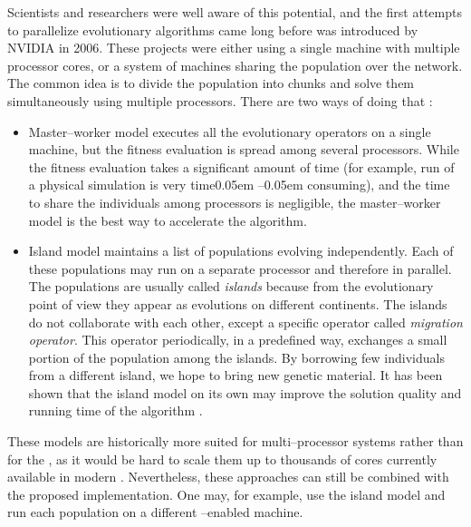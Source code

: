 Scientists and researchers were well aware of this potential, and the first attempts \citep{PGAPack} to parallelize evolutionary algorithms came long before \cuda was introduced by NVIDIA in 2006. These projects were either using a single machine with multiple processor cores, or a system of machines sharing the population over the network. The common idea is to divide the population into chunks and solve them simultaneously using multiple processors. There are two ways of doing that \citep{CHENG2019514}:
\begin{itemize}
    \item Master--worker model executes all the evolutionary operators on a single machine, but the fitness evaluation is spread among several processors. While the fitness evaluation takes a significant amount of time (for example, run of a physical simulation is very time\kern0.05em --\kern0.05em consuming), and the time to share the individuals among processors is negligible, the master--worker model is the best way to accelerate the algorithm.
    \item Island model maintains a list of populations evolving independently. Each of these populations may run on a separate processor and therefore in parallel. The populations are usually called \emph{islands} because from the evolutionary point of view they appear as evolutions on different continents. The islands do not collaborate with each other, except a specific operator called \emph{migration operator}. This operator periodically, in a predefined way, exchanges a small portion of the population among the islands. By borrowing few individuals from a different island, we hope to bring new genetic material. It has been shown that the island model on its own may improve the solution quality and running time of the algorithm \citep{IslandModel}.
\end{itemize}
These models are historically more suited for multi--processor systems rather than for the \gpuns, as it would be hard to scale them up to thousands of cores currently available in modern \gpuns. Nevertheless, these approaches can still be combined with the proposed implementation. One may, for example, use the island model and run each population on a different \gpuns--enabled machine.

